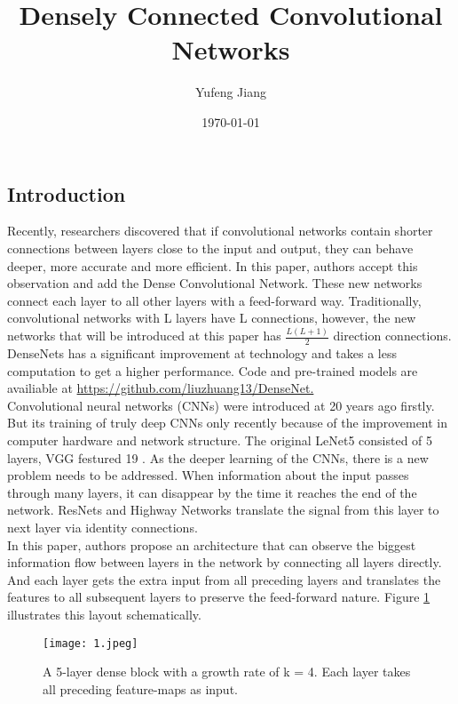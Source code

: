 \documentclass[10pt,letterpaper]{article}
\title{Densely Connected Convolutional Networks}
\author{Yufeng Jiang}
\date{\today}
\begin{document}
\maketitle
\balance
\begin{multicols}{2}
\section{Introduction}
Recently, researchers discovered that if convolutional networks contain shorter connections between layers close to the input and output, they can behave deeper, more accurate and more efficient. In this paper, authors accept this observation and add the Dense Convolutional Network. These new networks connect each layer to all other layers with a feed-forward way. Traditionally, convolutional networks with L layers have L connections, however, the new networks that will be introduced at this paper has $\frac{L(L+1)}{2}$ direction connections. DenseNets has a significant improvement at technology and takes a less computation to get a higher performance. Code and pre-trained models are availiable at \url{https://github.com/liuzhuang13/DenseNet.}\\
Convolutional neural networks (CNNs) were introduced at 20 years ago firstly\cite{Backpropagation}. But its training of truly deep CNNs only recently because of the improvement in computer hardware and network structure. The original LeNet5 \cite{recognition} consisted of 5 layers, VGG festured 19 \cite{Imagenet}. As the deeper learning of the CNNs, there is a new problem needs to be addressed. When information about the input passes through many layers, it can disappear by the time it reaches the end of the network. ResNets \cite{Deep} and Highway Networks \cite{Training} translate the signal from this layer to next layer via identity connections. \\
In this paper, authors propose an architecture that can observe the biggest information flow between layers in the network by connecting all layers directly. And each layer gets the extra input from all preceding layers and translates the features to all subsequent layers to preserve the feed-forward nature. Figure \ref{fig1} illustrates this layout schematically.\\
\end{multicols}
\begin{figure}[htbp]
 \centering
 \texttt{[image: 1.jpeg]}
 \caption{A 5-layer dense block with a growth rate of k = 4. Each layer takes all preceding feature-maps as input.}
 \label{fig1}
\end{figure}
\end{document}
